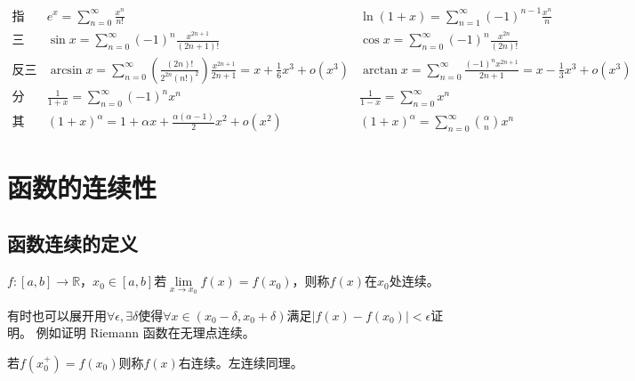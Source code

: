 \begin{equation*}
  \begin{array}{lll}
    \text{指数、对数：}& e^x = \sum\limits_{n = 0 }^{\infty}\frac{x^n}{n!}& \ln(1 + x) = \sum\limits_{n = 1}^{\infty}(-1)^{n-1}\frac{x^n}{n} \\
                       \text{三角：}&\sin x = \sum\limits_{n = 0}^{\infty}(-1)^n \frac{x^{2n+1}}{(2n+1)!}& \cos x = \sum\limits_{n = 0}^{\infty}(-1)^n \frac{x^{2n}}{(2n)!} \\
    \text{反三角：}&\arcsin x =\sum\limits_{n = 0}^{\infty}\left( \frac{(2n)!}{2^{2n}(n!)^2} \right)\frac{x^{2n+1}}{2n+1} =  x + \frac{1}{6}x^3 + o(x^3) &\arctan x = \sum\limits_{n = 0}^{\infty} \frac{(-1)^nx^{2n+1}}{2n+1} = x - \frac{1}{3}x^3 + o(x^3) \\
                       \text{分式：}&\frac{1}{1+x} = \sum\limits_{n = 0}^{\infty}(-1)^n x^n&\frac{1}{1 - x} = \sum\limits_{n = 0}^{\infty}x^n \\
                       \text{其他：}&(1+x)^{\alpha} = 1 + \alpha x + \frac{\alpha(\alpha - 1)}{2}x^2 + o(x^2)&(1 + x)^{\alpha} = \sum\limits_{n = 0}^{\infty}{\alpha \choose n} x^n
  \end{array}
\end{equation*}





\section{函数的连续性}

\subsection{函数连续的定义}

\begin{definition}[单点连续]
  $f: [a,b] \rightarrow \mathbb{R}$，$x_0 \in [a,b]$若$\lim \limits _{x \rightarrow x_0} f(x) = f(x_0)$，则称$f(x)$在$x_0$处连续。
\end{definition}

\begin{note}
  有时也可以展开用$\forall \epsilon, \exists \delta$使得$\forall x \in (x_0 - \delta, x_0 + \delta)$满足$|f(x) - f(x_0)| < \epsilon$证明。
  例如证明 Riemann 函数在无理点连续。
\end{note}

\begin{definition}[单点左右连续]
  若$f(x_0^+) = f(x_0)$则称$f(x)$右连续。左连续同理。
\end{definition}

